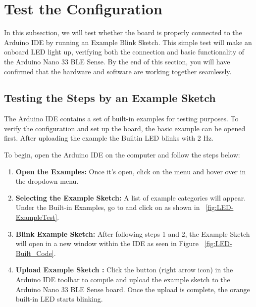 \section{Test the Configuration}

In this subsection, we will test whether the board is properly connected to the Arduino IDE by running an Example Blink Sketch. This simple test will make an onboard LED light up, verifying both the connection and basic functionality of the Arduino Nano 33 BLE Sense. By the end of this section, you will have confirmed that the hardware and software are working together seamlessly.


\subsection{Testing the Steps by an Example Sketch }


The Arduino IDE contains a set of built-in examples for testing purposes. To verify the configuration and set up the board, the basic example  can be opened first. After uploading the example  the Builtin LED blinks with 2 Hz. 


To begin, open the Arduino IDE on the computer and follow the steps below:

\begin{enumerate}



\item \textbf{Open the Examples:} Once it's open, click on the  menu and hover over  in the dropdown menu. 

\item \textbf{Selecting the Example Sketch:} A list of example categories will appear. Under the Built-in Examples, go to  and click on  as shown in ~\ref{fig:LED-ExampleTest}.

\item \textbf{Blink Example Sketch:} After following steps 1 and 2, the  Example Sketch  will open in a new window within the IDE as seen in Figure ~\ref{fig:LED-Built_Code}.

\item \textbf{Upload Example Sketch :} Click the  button (right arrow icon) in the Arduino IDE toolbar to compile and upload the example sketch to the Arduino Nano 33 BLE Sense board. Once the upload is complete, the orange built-in LED starts blinking. 



\end{enumerate}


